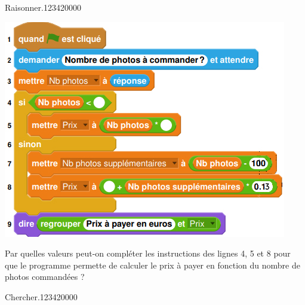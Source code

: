\begin{pageAuto}
\begin{ExoAuto}{Raisonner.}{1234}{2}{0}{0}{0}{0}
\begin{enumerate}
\includegraphics[scale=1]{FIG/scratch_fonction_cours.jpg} 

Par quelles valeurs peut-on compléter les instructions des lignes 4, 5 et 8 pour que
le programme permette de calculer le prix à payer en fonction du nombre de photos
commandées ?

\end{enumerate}


\end{ExoAuto}

  



 \begin{ExoAuto}{Chercher.}{1234}{2}{0}{0}{0}{0}
 
  
 
 \end{ExoAuto}
 
 
\end{pageAuto}


\begin{pageBrouillon} 
 



\end{pageBrouillon}